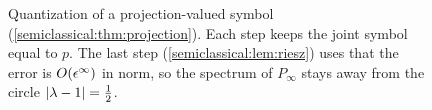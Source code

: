 \begin{figure}[ht]
\centering
{}
\caption{Quantization of a projection-valued symbol
(\cref{semiclassical:thm:projection}). Each step keeps the joint symbol equal
to $p$. The last step (\cref{semiclassical:lem:riesz}) uses that the error is
$O(\epsilon^\infty)$ in norm, so the spectrum of $P_\infty$ stays away from the
circle $\lvert \lambda-1\rvert=\frac12$.}
\label{semiclassical:fig:projection}
\end{figure}

